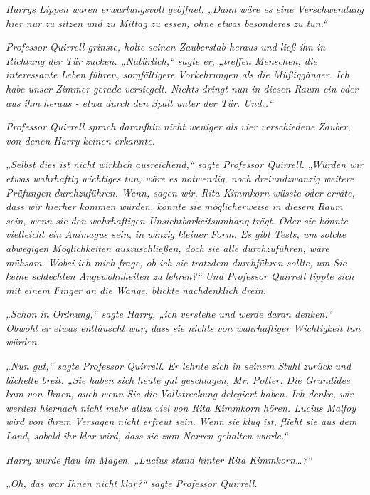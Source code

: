 {\emph{Harrys Lippen waren erwartungsvoll geöffnet. „Dann wäre es eine Verschwendung hier nur zu sitzen und zu Mittag zu essen, ohne etwas besonderes zu tun.“}

\emph{Professor Quirrell grinste, holte seinen Zauberstab heraus und ließ ihn in Richtung der Tür zucken. „Natürlich,“ sagte er, „treffen Menschen, die interessante Leben führen,} \emph{\emph{sorgfältigere}} \emph{Vorkehrungen als die Müßiggänger. Ich habe unser Zimmer gerade versiegelt. Nichts dringt nun in diesen Raum ein oder aus ihm heraus - etwa durch den Spalt unter der Tür. Und…“}

\emph{Professor Quirrell sprach daraufhin} \emph{nicht weniger als vier verschiedene} \emph{Zauber, von denen Harry keinen erkannte.}

\emph{„Selbst dies ist nicht} \emph{\emph{wirklich}} \emph{ausreichend,“ sagte Professor Quirrell. „Würden wir etwas wahrhaftig wichtiges tun, wäre es notwendig, noch dreiundzwanzig weitere Prüfungen durchzuführen. Wenn, sagen wir, Rita Kimmkorn wüsste oder erräte, dass wir hierher kommen würden, könnte sie möglicherweise in diesem Raum sein, wenn sie den wahrhaftigen Unsichtbarkeitsumhang trägt. Oder sie könnte vielleicht ein Animagus sein, in winzig kleiner Form. Es gibt Tests, um solche abwegigen Möglichkeiten auszuschließen, doch sie alle durchzuführen, wäre mühsam. Wobei ich mich frage, ob ich sie trotzdem durchführen sollte, um Sie keine schlechten Angewohnheiten zu lehren?“ Und Professor Quirrell tippte sich mit einem Finger an die Wange, blickte} \emph{nachdenklich} \emph{drein.}

\emph{„Schon in Ordnung,“ sagte Harry, „ich verstehe und werde daran denken.“ Obwohl er etwas enttäuscht war, dass sie nichts} \emph{von wahrhaftiger Wichtigkeit tun würden.}

\emph{„Nun gut,“ sagte Professor Quirrell. Er lehnte sich in seinem Stuhl zurück und lächelte breit. „Sie haben sich heute gut geschlagen, Mr. Potter. Die Grundidee kam von Ihnen, auch wenn Sie die} \emph{Vollstreckung} \emph{delegiert haben. Ich denke, wir werden hiernach nicht mehr} \emph{allzu} \emph{viel von Rita Kimmkorn hören. Lucius Malfoy wird von ihrem Versagen nicht erfreut sein. Wenn sie} \emph{klug} \emph{ist, flieht sie aus dem Land, sobald ihr klar wird, dass sie zum Narren gehalten wurde.“}

\emph{Harry wurde flau im Magen. „Lucius stand hinter Rita Kimmkorn…?“}

\emph{„Oh, das war Ihnen nicht klar?“ sagte Professor Quirrell.}

}
